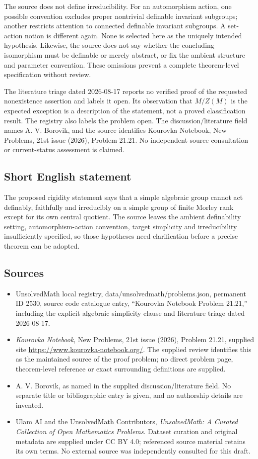 \documentclass[11pt]{article}
\begin{document}
The source does not define irreducibility. For an automorphism action, one possible convention excludes proper nontrivial definable invariant subgroups; another restricts attention to connected definable invariant subgroups. A set-action notion is different again. None is selected here as the uniquely intended hypothesis. Likewise, the source does not say whether the concluding isomorphism must be definable or merely abstract, or fix the ambient structure and parameter convention. These omissions prevent a complete theorem-level specification without review.

The literature triage dated 2026-08-17 reports no verified proof of the requested nonexistence assertion and labels it open. Its observation that $M/Z(M)$ is the expected exception is a description of the statement, not a proved classification result. The registry also labels the problem open. The discussion/literature field names A. V. Borovik, and the source identifies Kourovka Notebook, New Problems, 21st issue (2026), Problem 21.21. No independent source consultation or current-status assessment is claimed.
\subsection{Short English statement}
The proposed rigidity statement says that a simple algebraic group cannot act definably, faithfully and irreducibly on a simple group of finite Morley rank except for its own central quotient. The source leaves the ambient definability setting, automorphism-action convention, target simplicity and irreducibility insufficiently specified, so those hypotheses need clarification before a precise theorem can be adopted.
\subsection{Sources}
\begin{itemize}
\item UnsolvedMath local registry, data/unsolvedmath/problems.json, permanent ID 2530, source code catalogue entry, ``Kourovka Notebook Problem 21.21,'' including the explicit algebraic simplicity clause and literature triage dated 2026-08-17.
\item \emph{Kourovka Notebook}, New Problems, 21st issue (2026), Problem 21.21, supplied site \url{https://www.kourovka-notebook.org/}. The supplied review identifies this as the maintained source of the proof problem; no direct problem page, theorem-level reference or exact surrounding definitions are supplied.
\item A. V. Borovik, as named in the supplied discussion/literature field. No separate title or bibliographic entry is given, and no authorship details are invented.
\item Ulam AI and the UnsolvedMath Contributors, \emph{UnsolvedMath: A Curated Collection of Open Mathematics Problems}. Dataset curation and original metadata are supplied under CC BY 4.0; referenced source material retains its own terms. No external source was independently consulted for this draft.
\end{itemize}
\end{document}
